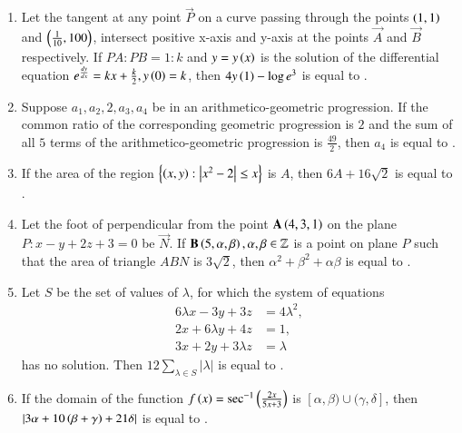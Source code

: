 \documentclass[journal]{IEEEtran}
\begin{document}
\begin{enumerate}[start = 16]
\begin{center}
	\end{center}
\item Let the tangent at any point $\vec{P}$ on a curve passing through the points $\left(1,1\right)$ and $\left(\frac{1}{10},100\right)$, intersect positive x-axis and y-axis at the points $\vec{A}$ and $\vec{B}$ respectively. If $PA : PB = 1 : k$ and $y=y\left(x\right)$ is the solution of the differential equation $e^{\frac{dy}{dx}} = kx + \frac{k}{2}, y\left(0\right) = k$, then $4y\left(1\right) -\log e^3$ is equal to \underline{\hspace{1 cm}}. 
\item Suppose $a_1, a_2, 2, a_3, a_4$ be in an arithmetico-geometric progression. If the common ratio of the corresponding geometric progression is $2$ and the sum of all $5$ terms of the arithmetico-geometric progression is $\frac{49}{2}$, then $a_4$ is equal to \underline{\hspace{1 cm}}. 
\item If the area of the region $\left\{\left(x,y\right) : \left\vert x^2-2\right\vert \le x\right\}$ is $A$, then $6A + 16\sqrt{2}$ is equal to \underline{\hspace{1 cm}}. 
\item Let the foot of perpendicular from the point $\mathbf{A} \left(4,3,1\right)$ on the plane $P : x - y + 2z +3 = 0$ be $\vec{N}$. If $\mathbf{B}\left(5,\alpha,\beta\right), \alpha, \beta \in \mathbb{Z}$ is a point on plane $P$ such that the area of triangle $ABN$ is $3\sqrt{2}$, then $\alpha^2 + \beta^2 +\alpha\beta $ is equal to \underline{\hspace{1 cm}}. 
\item Let $S$ be the set of values of $\lambda$, for which the system of equations 
\begin{align*}
	6\lambda x - 3y + 3z &= 4\lambda^2,\\ 
	2x + 6\lambda y + 4z &= 1, \\
	3x + 2y + 3\lambda z &= \lambda 
\end{align*}
has no solution. Then $12 \sum_{\lambda \in S} |\lambda|$ is equal to \underline{\hspace{1 cm}}. 
\item If the domain of the function $f\left(x\right) = \sec^{-1}\left(\frac{2x}{5x+3}\right)$ is $[\alpha,\beta) \cup (\gamma,\delta]$, then $\left\vert3\alpha +10\left(\beta + \gamma\right) + 21\delta\right\vert$ is equal to \underline{\hspace{1 cm}}. 

\end{enumerate}
\end{document}
